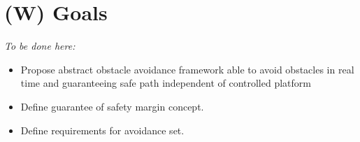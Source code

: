 \section{(W) Goals}\label{s:goals}
    \emph{To be done here:}
    \begin{itemize}
        \item Propose abstract obstacle avoidance framework able to avoid obstacles in real time and guaranteeing safe path independent of controlled platform
        \item Define guarantee of safety margin concept.
        \item Define requirements for avoidance set.
    \end{itemize}